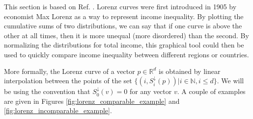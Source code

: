 This section is based on Ref. \cite[pp. 5--6]{marshall_inequalities_2011}. Lorenz curves were first introduced in 1905 by economist Max Lorenz as a way to represent income inequality. By plotting the cumulative sums of two distributions, we can say that if one curve is above the other at all times, then it is more unequal (more disordered) than the second. By normalizing the distributions for total income, this graphical tool could then be used to quickly compare income inequality between different regions or countries.

More formally, the Lorenz curve of a vector $p \in \mathbb{R}^d$ is obtained by linear interpolation between the points of the set $\{(i, S^\downarrow_i(p)) | i \in \mathbb{N}, i \leq d\}$.
We will be using the convention that $S^\downarrow_0 (v) = 0$ for any vector $v$. A couple of examples are given in Figures \ref{fig:lorenz_comparable_example} and \ref{fig:lorenz_incomparable_example}.

